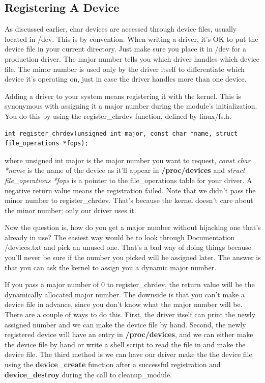 \documentclass[11pt]{article}
\begin{document}
\subsection*{Registering A Device}
\label{sec:orge720278}
As discussed earlier, char devices are accessed through device files, usually located in /dev. This is by convention. When writing a driver, it's OK to put the device file in your current directory. Just make sure you place it in /dev for a production driver. The major number tells you which driver handles which device file. The minor number is used only by the driver itself to differentiate which device it's operating on, just in case the driver handles more than one device.

Adding a driver to your system means registering it with the kernel. This is synonymous with assigning it a major number during the module's initialization. You do this by using the register\_chrdev function, defined by linux/fs.h.

\begin{verbatim}
int register_chrdev(unsigned int major, const char *name, struct file_operations *fops);
\end{verbatim}

where unsigned int major is the major number you want to request, \emph{const char *name} is the name of the device as it'll appear in \textbf{/proc/devices} and \emph{struct file\_operations *fops} is a pointer to the file\_operations table for your driver. A negative return value means the registration failed. Note that we didn't pass the minor number to register\_chrdev. That's because the kernel doesn't care about the minor number; only our driver uses it.

Now the question is, how do you get a major number without hijacking one that's already in use? The easiest way would be to look through Documentation /devices.txt and pick an unused one. That's a bad way of doing things because you'll never be sure if the number you picked will be assigned later. The answer is that you can ask the kernel to assign you a dynamic major number.

If you pass a major number of 0 to register\_chrdev, the return value will be the dynamically allocated major number. The downside is that you can't make a device file in advance, since you don't know what the major number will be. There are a couple of ways to do this. First, the driver itself can print the newly assigned number and we can make the device file by hand. Second, the newly registered device will have an entry in \textbf{/proc/devices}, and we can either make the device file by hand or write a shell script to read the file in and make the device file. The third method is we can have our driver make the the device file using the \textbf{device\_create} function after a successful registration and \textbf{device\_destroy} during the call to cleanup\_module.
\end{document}
